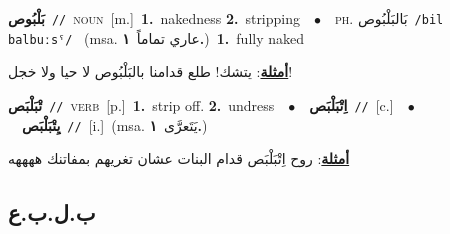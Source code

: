 \documentclass[10pt,a4paper,twoside]{article} %
\begin{document}
\begin{multicols}{2}
{\setlength\topsep{0pt}\textbf{\foreignlanguage{arabic}{بَلْبُوص}}\ {\color{gray}\texttt{//}\color{black}}\ \textsc{noun}\ [m.]\ \textbf{1.}~nakedness  \textbf{2.}~stripping\ \ $\bullet$\ \ \textsc{ph.} \color{gray} \foreignlanguage{arabic}{بَالبَلْبُوص}\color{black}\ {\color{gray}\texttt{/{\sffamily bil balbuːsˤ}/}\color{black}}\ \color{gray} (msa. \foreignlanguage{arabic}{عاري تماماً}~\foreignlanguage{arabic}{\textbf{١.}})\color{black}\ \textbf{1.}~fully naked\  \begin{flushright}\color{gray}\foreignlanguage{arabic}{\textbf{\underline{\foreignlanguage{arabic}{أمثلة}}}: يتشك! طلع قدامنا بالبَلْبُوص لا حيا ولا خجل!}\end{flushright}\color{black}} \vspace{2mm}

{\setlength\topsep{0pt}\textbf{\foreignlanguage{arabic}{تْبَلْبَص}}\ {\color{gray}\texttt{//}\color{black}}\ \textsc{verb}\ [p.]\ \textbf{1.}~strip off.  \textbf{2.}~undress\ \ $\bullet$\ \ \setlength\topsep{0pt}\textbf{\foreignlanguage{arabic}{اِتْبَلْبَص}}\ {\color{gray}\texttt{//}\color{black}}\ [c.]\ \ $\bullet$\ \ \setlength\topsep{0pt}\textbf{\foreignlanguage{arabic}{يِتْبَلْبَص}}\ {\color{gray}\texttt{//}\color{black}}\ [i.]\ \color{gray}(msa. \foreignlanguage{arabic}{يَتَعرَّى}~\foreignlanguage{arabic}{\textbf{١.}})\color{black}\  \begin{flushright}\color{gray}\foreignlanguage{arabic}{\textbf{\underline{\foreignlanguage{arabic}{أمثلة}}}: روح اِتْبَلْبَص قدام البنات عشان تغريهم بمفاتنك ههههه}\end{flushright}\color{black}} \vspace{2mm}

\vspace{-3mm}
\subsection*{\color{blue}\foreignlanguage{arabic}{ب.ل.ب.ع}\color{blue}{}} 


\end{multicols}
\end{document}
